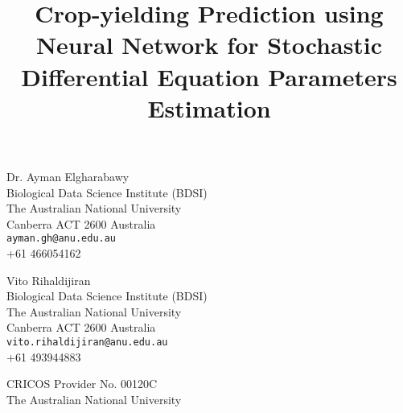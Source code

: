 \documentclass[12pt]{article}
\title{Crop-yielding Prediction using Neural Network for Stochastic Differential Equation Parameters Estimation}
\date{}
\begin{document}
\maketitle

\begin{center}
    \begin{minipage}{0.4\textwidth}
        \begin{center}
            Dr. Ayman Elgharabawy \\
            Biological Data Science Institute (BDSI) \\
            The Australian National University \\
            Canberra ACT 2600 Australia \\
            \texttt{ayman.gh@anu.edu.au} \\
            +61 466054162 
        \end{center}
    \end{minipage}
    \hfill
    \begin{minipage}{0.4\textwidth}
        \begin{center}
            Vito Rihaldijiran \\
            Biological Data Science Institute (BDSI) \\
            The Australian National University \\
            Canberra ACT 2600 Australia \\
            \texttt{vito.rihaldijiran@anu.edu.au} \\
            +61 493944883
        \end{center}
    \end{minipage}
\end{center}






\newpage





\vfill
\noindent CRICOS Provider No. 00120C \\
The Australian National University
\end{document}
